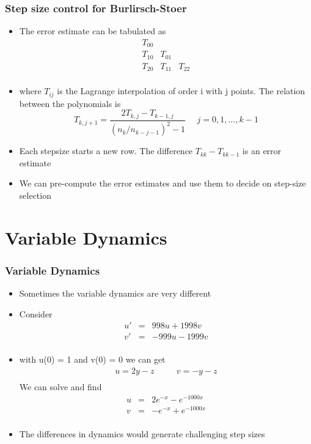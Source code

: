 \documentclass[10pt]{beamer}
\begin{document}
\begin{frame}
  \frametitle{Step size control for Burlirsch-Stoer}
  \begin{itemize}
  \item The error estimate can be tabulated as
    \[
      \begin{array}{lll}
        T_{00} && \\
        T_{10} & T_{01} & \\
        T_{20} & T_{11} & T_{22} \\
      \end{array}
    \]
  \item where $T_{ij}$ is the Lagrange interpolation of order i with j points. The relation between the polynomials is
    \[
      T_{k, j+1} = \frac{2 T_{k,j} - T_{k-1,j}}{(n_k / n_{k-j-1})^2 - 1} \mbox{~~~~} j = 0, 1, \ldots, k-1
    \]
  \item Each stepsize starts a new row. The difference
    $T_{kk} - T_{kk-1}$ is  an error estimate
  \item We can pre-compute the error estimates and use them to decide
    on step-size selection
  \end{itemize}
\end{frame}


\section{Variable Dynamics}

\begin{frame}
  \frametitle{Variable Dynamics}
  \begin{itemize}
  \item Sometimes the variable dynamics are very different
  \item Consider
    \[
      \begin{array}{rcl}
        u' & = & 998 u + 1998 v\\
        v' & = & -999u - 1999 v\\
      \end{array}
    \]
  \item with u(0) = 1 and v(0) = 0 we can get
    \[
      \begin{array}{rcl}
        u = 2 y - z & \mbox{~~~}& v = -y -z \\
      \end{array}
    \]
    We can solve and find
    \[
      \begin{array}{rcl}
        u & = & 2 e^{-x} - e^{-1000x}\\
        v & = & - e^{-x} + e^{-1000x}\\
      \end{array}
    \]
  \item The differences in dynamics would generate challenging step sizes
  \end{itemize}
\end{frame}
\end{document}
